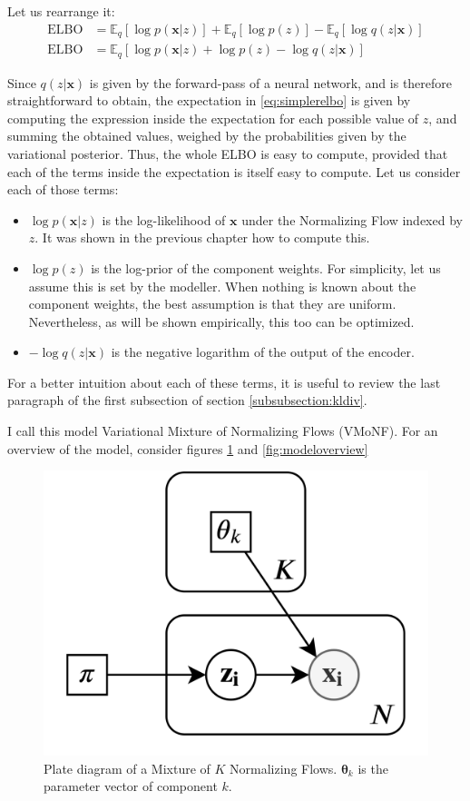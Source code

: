 Let us rearrange it:
\begin{align}
    \text{ELBO} &= \mathbb{E}_q [\log p(\bm{x}|z)] + \mathbb{E}_q [\log p(z)] - \mathbb{E}_q [\log q(z|\bm{x})]
        \label{eq:threepartelbo} \\
    \text{ELBO} &= \mathbb{E}_q [\log p(\bm{x}|z) + \log p(z) - \log q(z|\bm{x})] \label{eq:simplerelbo}
\end{align}

Since $q(z|\bm{x})$ is given by the forward-pass of a neural network, and is therefore
straightforward to obtain, the expectation in \ref{eq:simplerelbo} is given by
computing the expression inside the expectation for each possible value of $z$,
and summing the obtained values, weighed by the probabilities given by the variational posterior.
Thus, the whole ELBO is easy to compute, provided that each of the terms inside
the expectation is itself easy to compute. Let us consider each of those terms:
\begin{itemize}
    \item $\log p(\bm{x}|z)$ is the log-likelihood of $\bm{x}$ under the Normalizing
        Flow indexed by $z$. It was shown in the previous chapter how to compute
        this.
    \item $\log p(z)$ is the log-prior of the component weights. For simplicity,
        let us assume this is set by the modeller. When nothing is known about
        the component weights, the best assumption is that they are uniform.
        Nevertheless, as will be shown empirically, this too can be optimized.
    \item $- \log q(z|\bm{x})$ is the negative logarithm of the output of the encoder.
\end{itemize}

For a better intuition about each of these terms, it is useful to review the last
paragraph of the first subsection of section \ref{subsubsection:kldiv}.

I call this model Variational Mixture of Normalizing Flows (VMoNF). For an overview of
the model, consider figures \ref{fig:plate} and \ref{fig:modeloverview}

\begin{figure}[!htb]
  \centering
  \includegraphics[width=0.5\linewidth]{figures/plate_diagram.png}
  \caption{Plate diagram of a Mixture of $K$ Normalizing Flows. $\bm\theta_k$ is the
    parameter vector of component $k$.}
  \label{fig:plate}
\end{figure}

